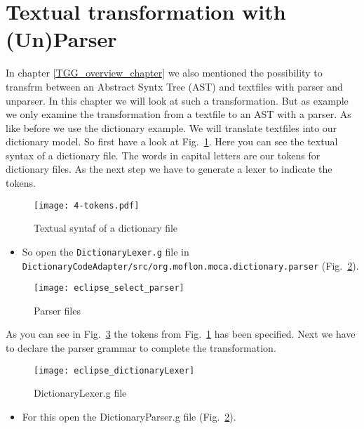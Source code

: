 \section{Textual transformation with (Un)Parser}
In chapter \ref{TGG_overview_chapter} we also mentioned the possibility to transfrm between an Abstract Syntx Tree (AST) and textfiles with parser and unparser. In this chapter we will look at such a transformation. But as example we only examine the transformation from a textfile to an AST with a parser.
\newline
\newline
As like before we use the dictionary example. We will translate textfiles into our dictionary model. So first have a look at Fig.~\ref{textual_syntax}. Here you can see the textual syntax of a dictionary file. The words in capital letters are our tokens for dictionary files.
\newline
As the next step we have to generate a lexer to indicate the tokens.

\begin{figure}[htbp]
	\centering
	\texttt{[image: 4-tokens.pdf]}
	\caption{Textual syntaf of a dictionary file} 
	\label{textual_syntax} 
\end{figure} 

\begin{itemize}
\item So open the \texttt{DictionaryLexer.g} file in \texttt{Dictionary\-Code\-Adap\-ter/\-src/\-org.\-moflon.\-moca.\-dictionary.\-parser} (Fig.~\ref{ParserFiles}).
\end{itemize}

\begin{figure}[htbp]
	\centering
	\texttt{[image: eclipse\_select\_parser]}
	\caption{Parser files} 
	\label{ParserFiles} 
\end{figure} 

As you can see in Fig.~\ref{DictionaryLexer} the tokens from Fig.~\ref{textual_syntax} has been specified.
\newline
Next we have to declare the parser grammar to complete the transformation.

\begin{figure}[htbp]
	\centering
	\texttt{[image: eclipse\_dictionaryLexer]}
	\caption{DictionaryLexer.g file} 
	\label{DictionaryLexer} 
\end{figure} 

\begin{itemize}
\item For this open the DictionaryParser.g file (Fig.~\ref{ParserFiles}). 
\end{itemize}

